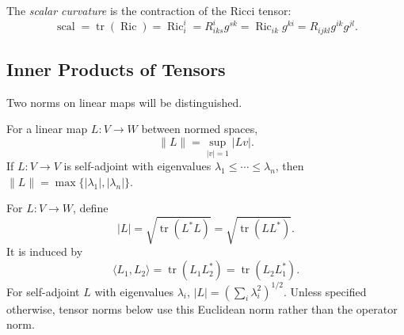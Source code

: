 \begin{definition}
  \label{def:pet-ch1-scalar-curvature}


  The \emph{scalar curvature} is the contraction of the Ricci tensor:
  \[
    \operatorname{scal}
      =\operatorname{tr}(\operatorname{Ric})
      =\operatorname{Ric}^i_i
      =R^i_{iks}g^{sk}
      =\operatorname{Ric}_{ik}g^{ki}
      =R_{ijkl}g^{ik}g^{jl}.
  \]
\end{definition}

\subsection{Inner Products of Tensors}

Two norms on linear maps will be distinguished.

\begin{definition}
  \label{def:pet-ch1-operator-norm}


  For a linear map $L:V\to W$ between normed spaces,
  \[
    \|L\|=\sup_{|v|=1}|Lv|.
  \]
  If $L:V\to V$ is self-adjoint with eigenvalues
  $\lambda_1\le\cdots\le\lambda_n$, then
  $\|L\|=\max\{|\lambda_1|,|\lambda_n|\}$.
\end{definition}

\begin{definition}
  \label{def:pet-ch1-euclidean-norm}


  For $L:V\to W$, define
  \[
    |L|=\sqrt{\operatorname{tr}(L^*L)}
      =\sqrt{\operatorname{tr}(LL^*)}.
  \]
  It is induced by
  \[
    \langle L_1,L_2\rangle
      =\operatorname{tr}(L_1L_2^*)
      =\operatorname{tr}(L_2L_1^*).
  \]
  For self-adjoint $L$ with eigenvalues $\lambda_i$,
  $|L|=(\sum_i\lambda_i^2)^{1/2}$. Unless specified otherwise, tensor norms
  below use this Euclidean norm rather than the operator norm.
\end{definition}

